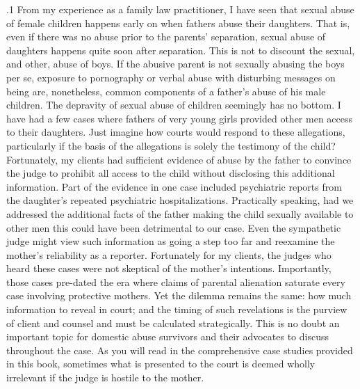 \documentclass[11pt, twoside]{article}
\begin{document}
{\p.1{%
From my experience as a family law practitioner, I have seen that sexual abuse of female children happens early on when fathers abuse their
daughters. That is, even if there was no abuse prior to the parents' separation, sexual abuse of daughters happens quite soon after separation.
This is not to discount the sexual, and other, abuse of boys. If the abusive
parent is not sexually abusing the boys per se, exposure to pornography
or verbal abuse with disturbing messages on being  are, nonetheless, common components of a father's abuse of his male children. The
depravity of sexual abuse of children seemingly has no bottom. I have
had a few cases where fathers of very young girls provided other men
access to their daughters. Just imagine how courts would respond to
these allegations, particularly if the basis of the allegations is solely the
testimony of the child? Fortunately, my clients had sufficient evidence
of abuse by the father to convince the judge to prohibit all access to the
child without disclosing this additional information. Part of the evidence
in one case included psychiatric reports from the daughter's repeated
psychiatric hospitalizations. Practically speaking, had we addressed the
additional facts of the father making the child sexually available to other
men this could have been detrimental to our case. Even the sympathetic
judge might view such information as going a step too far and reexamine the mother's reliability as a reporter. Fortunately for my clients,
the judges who heard these cases were not skeptical of the mother's
intentions. Importantly, those cases pre-dated the era where claims of
parental alienation saturate every case involving protective mothers. Yet
the dilemma remains the same: how much information to reveal in court;
and the timing of such revelations is the purview of client and counsel
and must be calculated strategically. This is no doubt an important topic
for domestic abuse survivors and their advocates to discuss throughout
the case. As you will read in the comprehensive case studies provided in
this book, sometimes what is presented to the court is deemed wholly
irrelevant if the judge is hostile to the mother.
} %

}
\end{document}
